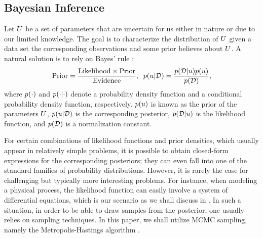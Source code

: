 \subsection{Bayesian Inference} 
Let $U$ be a set of parameters that are uncertain for us either in nature or due to our limited knowledge. The goal is to characterize the distribution of $U$ given a data set the corresponding observations and some prior believes about $U$. A natural solution is to rely on Bayes' rule \cite{gelman2004}:
\begin{equation} \elabel{bayes}
  \text{Prior} = \frac{\text{Likelihood} \times \text{Prior}}{\text{Evidence}}, \;\; \f{\u | \data} = \frac{\f{\data | \u} \f{\u}}{\f{\data}},
\end{equation}
where $\f{\cdot}$ and $\f{\cdot | \cdot}$ denote a probability density function and a conditional probability density function, respectively. $\f{\u}$ is known as the prior of the parameters $U$, $\f{\u | \data}$ is the corresponding posterior, $\f{\data | \u}$ is the likelihood function, and $\f{\data}$ is a normalization constant.

For certain combinations of likelihood functions and prior densities, which usually appear in relatively simple problems, it is possible to obtain closed-form expressions for the corresponding posteriors; they can even fall into one of the standard families of probability distributions. However, it is rarely the case for challenging but typically more interesting problems. For instance, when modeling a physical process, the likelihood function can easily involve a system of differential equations, which is our scenario as we shall discuss in . In such a situation, in order to be able to draw samples from the posterior, one usually relies on sampling techniques. In this paper, we shall utilize MCMC sampling, namely the Metropolis-Hastings algorithm \cite{gelman2004}.

